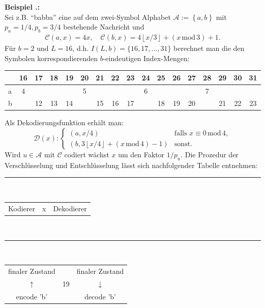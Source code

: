 \documentclass[a4paper,12pt]{article}
\newcommand{\A}{\mathcal A}
\newcommand{\C}{\mathcal C}
\newcommand{\D}{\mathcal D}
\newcounter{Beispiel}
\newenvironment{Beispiel}{
\medskip
        
        \setlength{\parindent}{0pt}
        \addtocounter{Beispiel}{1}
        \textbf{\textsf{Beispiel \thesubsection.\theBeispiel}:}\\}{
        \nopagebreak
        \vspace{-1.0ex}
        \bigskip
        
}
\begin{document}
\begin{Beispiel}
Sei z.B. "`babba"' eine auf dem zwei-Symbol Alphabet  $\A :=\left\{a, b\right\}$  mit $p_a=1 /4, p_b = 3/4$ bestehende Nachricht und
\begin{align*}
\C(a,x) =4 x,\quad
\C(b,x) = 4 \left\lfloor x/3 \right\rfloor + \left(x\,\text{mod}\, 3\right)+ 1.
\end{align*}
Für $b=2$ und $L=16$, d.h. $I(L,b)=\{16,17,\ldots,31\}$ berechnet man die den Symbolen korrespondierenden $b$-eindeutigen Index-Mengen:
\par
\vspace{0.5cm}
\begin{center}
 \begin{tabular}{l|c|c|c|c|c|c|c|c|c|c|c|c|c|c|c|c}
 & 16 & 17 & 18 & 19 & 20 & 21 & 22 & 23 & 24 & 25 & 26 & 27 & 28 & 29 & 30 &31\\
\hline
a	& 4 & & & & 5	& &  & & 6 & &  & & 7 & & &	\\
\hline
b	&  & 12 & 13 & 14 & 	& 15 & 16 & 17 &  & 18 & 19 & 20 &  & 21 & 22 & 23 	\\
\end{tabular}
\end{center}
\vspace{0.5cm}
Als Dekodierungsfunktion erhält man:
$$
\D(x):
               \begin{cases}
                 \left(a,x / 4\right)          & \text{falls}\,\, x \equiv 0 \,\text{mod}\, 4,\\
                   \left(b,3 \left\lfloor x/4\right\rfloor + \left(x\,\text{mod}\, 4\right)- 1 \right) & \text{sonst}.
                \end{cases}
$$
Wird $u\in\A$ mit $\C$ codiert wächst $x$ um den Faktor $1 / p_u$.
Die Prozedur der Verschlüsselung und Entschlüsselung lässt sich nachfolgender Tabelle entnehmen:
\begin{center}
{\color{gray!50!blue}\rule{8cm}{0.5mm}}
\\
\begin{tabular}{c c c}
Kodierer & x & Dekodierer
\end{tabular}
\vspace{-0.2cm}
\\
{\color{gray!50!blue}\rule{8cm}{0.1mm}}
\\
\begin{tabular}{c c c}
finaler Zustand & & finaler Zustand
\\
$\uparrow$ & 19 & $\downarrow$
\\
encode 'b' & & decode 'b'
\\

\end{tabular}
\end{center}
\end{Beispiel}
\end{document}
